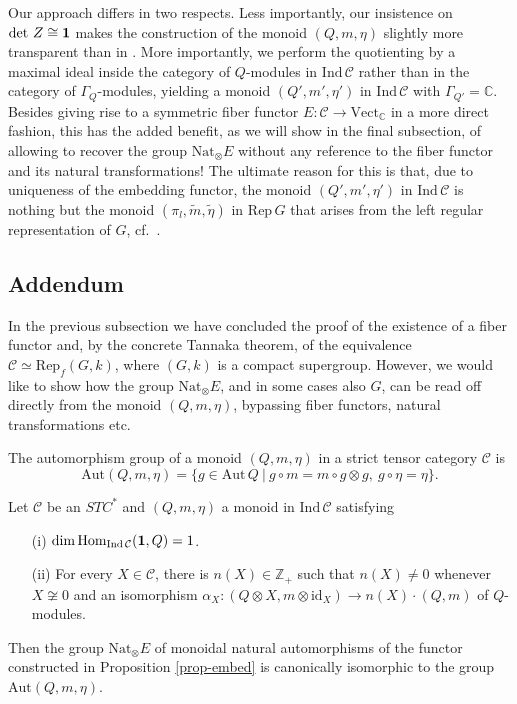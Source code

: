 \documentclass[12pt]{article}
\theoremstyle{definition}
\theoremstyle{definition}
\theoremstyle{remark}
\newcommand{\Vect}{\mathrm{Vect}}
\def\2#1{{\mathcal #1}}
\def\7#1{{\mathbb #1}}
\def\1#1{{\bf #1}}
\newcommand{\Hom}{\mathrm{Hom}}
\newcommand{\Aut}{\mathrm{Aut}}
\newcommand{\Rep}{\mathrm{Rep}}
\newcommand{\rarr}{\rightarrow}
\def\id{\mathrm{id}}
\newcommand{\Nat}{\mathrm{Nat}}
\begin{document}
Our approach differs in two respects. Less importantly, our insistence on $\det\,Z\cong\11$ makes the
construction of the monoid $(Q,m,\eta)$ slightly more transparent than in \cite{bichon}. More
importantly, we perform the quotienting by a maximal ideal inside the category of $Q$-modules 
in $\mathrm{Ind}\,\2C$ rather than in the category of $\Gamma_Q$-modules, yielding a monoid
$(Q',m',\eta')$ in $\mathrm{Ind}\,\2C$ with $\Gamma_{Q'}=\7C$. Besides giving rise to a symmetric
fiber functor $E:\2C\rarr\Vect_\7C$ in a more direct fashion, this has the added benefit, as we will
show in the final subsection, of allowing to recover the group $\Nat_\otimes E$ without any
reference to the fiber functor and its natural transformations! The ultimate reason for 
this is that, due to uniqueness of the embedding functor, the monoid $(Q',m',\eta')$ in
$\mathrm{Ind}\,\2C$ is nothing but the monoid $(\pi_l,\tilde{m},\tilde{\eta})$ in $\Rep\,G$ that
arises from the left regular representation of $G$, cf.\ \cite{MT}. 
\erem





\subsection{Addendum} \label{ss-add}
In the previous subsection we have concluded the proof of the existence of a fiber functor and, by
the concrete Tannaka theorem, of the equivalence $\2C\simeq\Rep_f(G,k)$, where $(G,k)$ is a compact
supergroup. However, we would like to show how the group $\mathrm{Nat}_\otimes E$, and in some cases
also $G$, can be read off directly from the monoid $(Q,m,\eta)$, bypassing fiber functors, natural
transformations etc. 

\bdefin 
The automorphism group of a monoid $(Q,m,\eta)$ in a strict tensor category $\2C$ is 
\[ \Aut(Q,m,\eta)=\{ g\in\Aut\,Q\ | \ g\circ m=m\circ g\otimes g, \ g\circ\eta=\eta\}. \]
\edefin

\bprop 
Let $\2C$ be an $STC^*$ and $(Q,m,\eta)$ a monoid in $\mathrm{Ind}\,\2C$ satisfying
\begin{itemize}
\item[(i)] $\dim\Hom_{\mathrm{Ind}\,\2C }(\11,Q)=1$.
\item[(ii)] For every $X\in\2C$, there is $n(X)\in\7Z_+$ such that $n(X)\ne 0$ whenever 
$X\not\cong 0$ and an isomorphism 
$\alpha_X:(Q\otimes X,m\otimes\id_X)\rarr n(X)\cdot(Q,m)$ of $Q$-modules.
\end{itemize}
Then the group $\Nat_\otimes E$ of monoidal natural automorphisms of the functor constructed in
Proposition \ref{prop-embed} is canonically isomorphic to the group $\Aut(Q,m,\eta)$.
\eprop
\end{document}
